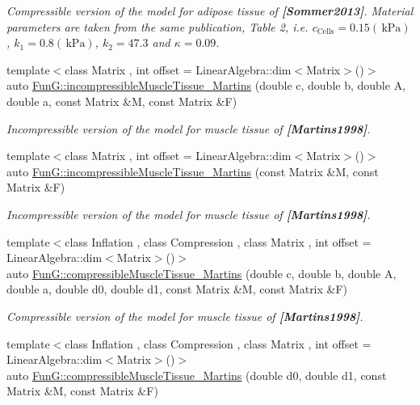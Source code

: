\begin{DoxyCompactItemize}
\begin{DoxyCompactList}\small\item\em Compressible version of the model for adipose tissue of {\bfseries [Sommer2013]}. Material parameters are taken from the same publication, Table 2, i.\+e. $c_\mathrm{Cells}=0.15 (\,\mathrm{kPa})$, $k_1=0.8 (\,\mathrm{kPa})$, $k_2=47.3$ and $\kappa=0.09$. \end{DoxyCompactList}\item 
{\footnotesize template$<$class Matrix , int offset = Linear\+Algebra\+::dim$<$\+Matrix$>$()$>$ }\\auto \hyperlink{group__Biomechanics_gafcc36a1958899ca9246c4c1b3c9bfd85}{Fun\+G\+::incompressible\+Muscle\+Tissue\+\_\+\+Martins} (double c, double b, double A, double a, const Matrix \&M, const Matrix \&F)
\begin{DoxyCompactList}\small\item\em Incompressible version of the model for muscle tissue of {\bfseries [Martins1998]}. \end{DoxyCompactList}\item 
{\footnotesize template$<$class Matrix , int offset = Linear\+Algebra\+::dim$<$\+Matrix$>$()$>$ }\\auto \hyperlink{group__Biomechanics_ga9e414585a90b1988e9fa88d17d875055}{Fun\+G\+::incompressible\+Muscle\+Tissue\+\_\+\+Martins} (const Matrix \&M, const Matrix \&F)
\begin{DoxyCompactList}\small\item\em Incompressible version of the model for muscle tissue of {\bfseries [Martins1998]}. \end{DoxyCompactList}\item 
{\footnotesize template$<$class Inflation , class Compression , class Matrix , int offset = Linear\+Algebra\+::dim$<$\+Matrix$>$()$>$ }\\auto \hyperlink{group__Biomechanics_gad831914c493a3da04ed40c3c0ce87a62}{Fun\+G\+::compressible\+Muscle\+Tissue\+\_\+\+Martins} (double c, double b, double A, double a, double d0, double d1, const Matrix \&M, const Matrix \&F)
\begin{DoxyCompactList}\small\item\em Compressible version of the model for muscle tissue of {\bfseries [Martins1998]}. \end{DoxyCompactList}\item 
{\footnotesize template$<$class Inflation , class Compression , class Matrix , int offset = Linear\+Algebra\+::dim$<$\+Matrix$>$()$>$ }\\auto \hyperlink{group__Biomechanics_ga46a70ccb2285e12addad87b6a8aaaae8}{Fun\+G\+::compressible\+Muscle\+Tissue\+\_\+\+Martins} (double d0, double d1, const Matrix \&M, const Matrix \&F)

\end{DoxyCompactItemize}
